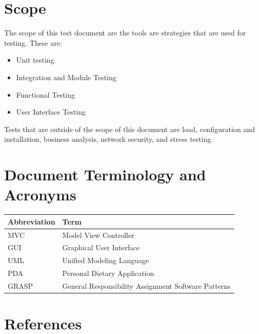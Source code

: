 \documentclass[table]{scrreprt}
\begin{document}
    \section{Scope}
    The scope of this test document are the tools are strategies that are used for testing. These are:
    \begin{itemize}
        \item Unit testing
        \item Integration and Module Testing
        \item Functional Testing
        \item User Interface Testing
    \end{itemize}
    Tests that are outside of the scope of this document are load, configuration and installation, business analysis, network security, and stress testing.


    \section{Document Terminology and Acronyms}

    \begin{tabular}{|l|l|}
        \hline
        \textbf{Abbreviation} & \textbf{Term} \\
        \hline
        MVC & Model View Controller \\
        \hline
        GUI & Graphical User Interface \\
        \hline
        UML & Unified Modeling Language \\
        \hline
        PDA & Personal Dietary Application \\
        \hline
        GRASP & General Responsibility Assignment Software Patterns \\
        \hline
    \end{tabular}

    \section{References}
\end{document}
